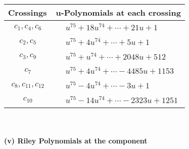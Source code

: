 \documentclass[1p]{elsarticle_modified}
\theoremstyle{definition}
\begin{document}
\begin{tabular}{m{50pt}|m{274pt}}
Crossings & \hspace{64pt}u-Polynomials at each crossing \\
\hline $$\begin{aligned}c_{1},c_{4},c_{6}\end{aligned}$$&$\begin{aligned}
&u^{75}+18 u^{74}+\cdots+21 u+1
\end{aligned}$\\
\hline $$\begin{aligned}c_{2},c_{5}\end{aligned}$$&$\begin{aligned}
&u^{75}+4 u^{74}+\cdots+5 u+1
\end{aligned}$\\
\hline $$\begin{aligned}c_{3},c_{9}\end{aligned}$$&$\begin{aligned}
&u^{75}+u^{74}+\cdots+2048 u+512
\end{aligned}$\\
\hline $$\begin{aligned}c_{7}\end{aligned}$$&$\begin{aligned}
&u^{75}+4 u^{74}+\cdots-4485 u+1153
\end{aligned}$\\
\hline $$\begin{aligned}c_{8},c_{11},c_{12}\end{aligned}$$&$\begin{aligned}
&u^{75}-4 u^{74}+\cdots-3 u+1
\end{aligned}$\\
\hline $$\begin{aligned}c_{10}\end{aligned}$$&$\begin{aligned}
&u^{75}-14 u^{74}+\cdots-2323 u+1251
\end{aligned}$\\
\hline
\end{tabular}\\~\\
\newpage\renewcommand{\arraystretch}{1}
\flushleft \textbf{(v) Riley Polynomials at the component}\newline \\
\end{document}

